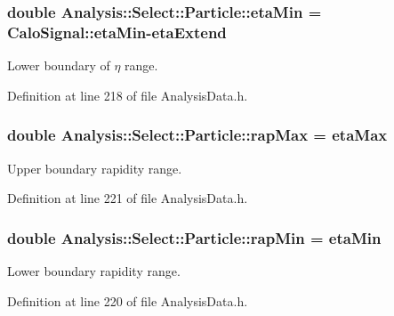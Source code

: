\subsubsection[{\texorpdfstring{eta\+Min}{etaMin}}]{\setlength{\rightskip}{0pt plus 5cm}double Analysis\+::\+Select\+::\+Particle\+::eta\+Min = Calo\+Signal\+::eta\+Min-\/{\bf eta\+Extend}\hspace{0.3cm}{\ttfamily [static]}}\hypertarget{namespaceAnalysis_1_1Select_1_1Particle_ac17ab5165e634e471d1d520d814a8e69}{}\label{namespaceAnalysis_1_1Select_1_1Particle_ac17ab5165e634e471d1d520d814a8e69}


Lower boundary of $ \eta $ range. 



Definition at line 218 of file Analysis\+Data.\+h.

\subsubsection[{\texorpdfstring{rap\+Max}{rapMax}}]{\setlength{\rightskip}{0pt plus 5cm}double Analysis\+::\+Select\+::\+Particle\+::rap\+Max = {\bf eta\+Max}\hspace{0.3cm}{\ttfamily [static]}}\hypertarget{namespaceAnalysis_1_1Select_1_1Particle_ae064bc4211aab509277062751d7b5bf2}{}\label{namespaceAnalysis_1_1Select_1_1Particle_ae064bc4211aab509277062751d7b5bf2}


Upper boundary rapidity range. 



Definition at line 221 of file Analysis\+Data.\+h.

\subsubsection[{\texorpdfstring{rap\+Min}{rapMin}}]{\setlength{\rightskip}{0pt plus 5cm}double Analysis\+::\+Select\+::\+Particle\+::rap\+Min = {\bf eta\+Min}\hspace{0.3cm}{\ttfamily [static]}}\hypertarget{namespaceAnalysis_1_1Select_1_1Particle_a74ff6d11b36b671ebc16e69953b5fa26}{}\label{namespaceAnalysis_1_1Select_1_1Particle_a74ff6d11b36b671ebc16e69953b5fa26}


Lower boundary rapidity range. 



Definition at line 220 of file Analysis\+Data.\+h.

